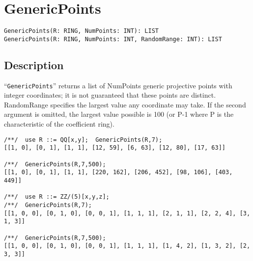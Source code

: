 \documentclass[a4paper]{mybook}
\newenvironment{command}{}{} %
\begin{document}
\section{GenericPoints}
\label{GenericPoints}
\begin{command} %


\begin{Verbatim}[label=syntax, rulecolor=\color{MidnightBlue},
frame=single]
GenericPoints(R: RING, NumPoints: INT): LIST
GenericPoints(R: RING, NumPoints: INT, RandomRange: INT): LIST
\end{Verbatim}


\subsection*{Description}

``\verb&GenericPoints&'' returns a list of NumPoints generic projective points
with integer coordinates; it is not guaranteed that these points are
distinct.  RandomRange specifies the largest value any coordinate may
take.  If the second argument is omitted, the largest value possible
is 100 (or P-1 where P is the characteristic of the coefficient ring).
\begin{Verbatim}[label=example, rulecolor=\color{PineGreen}, frame=single]
/**/  use R ::= QQ[x,y];  GenericPoints(R,7);
[[1, 0], [0, 1], [1, 1], [12, 59], [6, 63], [12, 80], [17, 63]]

/**/  GenericPoints(R,7,500);
[[1, 0], [0, 1], [1, 1], [220, 162], [206, 452], [98, 106], [403, 449]]

/**/  use R ::= ZZ/(5)[x,y,z];
/**/  GenericPoints(R,7);
[[1, 0, 0], [0, 1, 0], [0, 0, 1], [1, 1, 1], [2, 1, 1], [2, 2, 4], [3, 1, 3]]

/**/  GenericPoints(R,7,500);
[[1, 0, 0], [0, 1, 0], [0, 0, 1], [1, 1, 1], [1, 4, 2], [1, 3, 2], [2, 3, 3]]
\end{Verbatim}


\end{command} %
\end{document}
